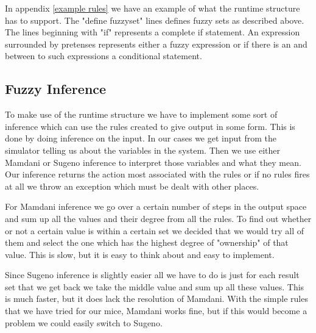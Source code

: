 In appendix \ref{example rules} we have an example of what the runtime structure
has to support. The "define fuzzyset" lines defines fuzzy sets as described above.
The lines beginning with "if" represents a complete if statement. An expression
surrounded by pretenses represents either a fuzzy expression or if there is an
and between to such expressions a conditional statement.

\subsection{Fuzzy Inference}\label{fuzzy inference}
To make use of the runtime structure we have to implement some sort of inference
which can use the rules created to give output in some form. This is done by
doing inference on the input. In our cases we get input from the simulator
telling us about the variables in the system. Then we use either Mamdani or
Sugeno inference to interpret those variables and what they mean. Our inference
returns the action most associated with the rules or if no rules fires at all
we throw an exception which must be dealt with other places.

For Mamdani inference we go over a certain number of steps in the output space
and sum up all the values and their degree from all the rules. To find out
whether or not a certain value is within a certain set we decided that we would
try all of them and select the one which has the highest degree of "ownership"
of that value. This is slow, but it is easy to think about and easy to implement.

Since Sugeno inference is slightly easier all we have to do is just for each result
set that we get back we take the middle value and sum up all these values. This
is much faster, but it does lack the resolution of Mamdani. With the simple rules
that we have tried for our mice, Mamdani works fine, but if this would become a
problem we could easily switch to Sugeno.
